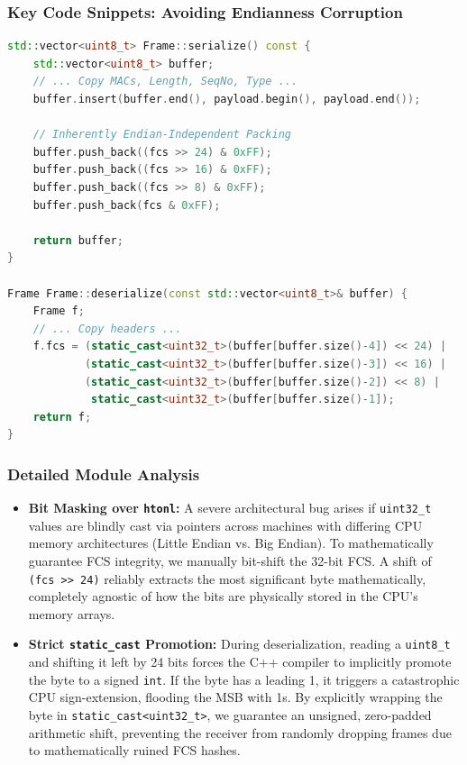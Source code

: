 \documentclass[12pt, a4paper]{article}
\begin{document}
\subsubsection{Key Code Snippets: Avoiding Endianness Corruption}
\begin{lstlisting}[language=C++]
std::vector<uint8_t> Frame::serialize() const {
    std::vector<uint8_t> buffer;
    // ... Copy MACs, Length, SeqNo, Type ...
    buffer.insert(buffer.end(), payload.begin(), payload.end());
    
    // Inherently Endian-Independent Packing
    buffer.push_back((fcs >> 24) & 0xFF);
    buffer.push_back((fcs >> 16) & 0xFF);
    buffer.push_back((fcs >> 8) & 0xFF);
    buffer.push_back(fcs & 0xFF);
    
    return buffer;
}

Frame Frame::deserialize(const std::vector<uint8_t>& buffer) {
    Frame f;
    // ... Copy headers ...
    f.fcs = (static_cast<uint32_t>(buffer[buffer.size()-4]) << 24) | 
            (static_cast<uint32_t>(buffer[buffer.size()-3]) << 16) | 
            (static_cast<uint32_t>(buffer[buffer.size()-2]) << 8) | 
             static_cast<uint32_t>(buffer[buffer.size()-1]);
    return f;
}
\end{lstlisting}

\subsubsection{Detailed Module Analysis}
\begin{itemize}
    \item \textbf{Bit Masking over \texttt{htonl}:} A severe architectural bug arises if \texttt{uint32\_t} values are blindly cast via pointers across machines with differing CPU memory architectures (Little Endian vs. Big Endian). To mathematically guarantee FCS integrity, we manually bit-shift the 32-bit FCS. A shift of \texttt{(fcs >> 24)} reliably extracts the most significant byte mathematically, completely agnostic of how the bits are physically stored in the CPU's memory arrays.
    \item \textbf{Strict \texttt{static\_cast} Promotion:} During deserialization, reading a \texttt{uint8\_t} and shifting it left by 24 bits forces the C++ compiler to implicitly promote the byte to a signed \texttt{int}. If the byte has a leading 1, it triggers a catastrophic CPU sign-extension, flooding the MSB with 1s. By explicitly wrapping the byte in \texttt{static\_cast<uint32\_t>}, we guarantee an unsigned, zero-padded arithmetic shift, preventing the receiver from randomly dropping frames due to mathematically ruined FCS hashes.
\end{itemize}
\end{document}
